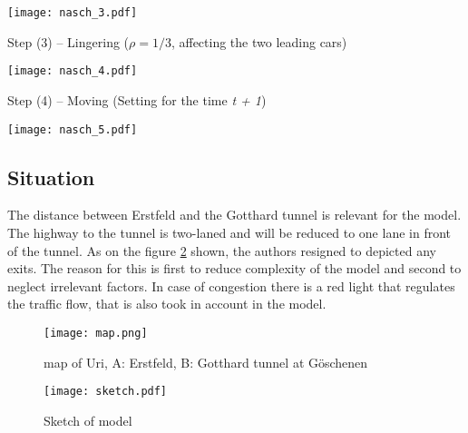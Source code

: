 \texttt{[image: nasch\_3.pdf]}\vspace*{1cm}

Step (3) -- Lingering ($\rho = 1/3$, affecting the two leading cars)\\ \vspace{-.2cm}

\texttt{[image: nasch\_4.pdf]}\vspace*{1cm}

Step (4) -- Moving (Setting for the time \textit{t + 1})\\ \vspace{-.2cm}

\texttt{[image: nasch\_5.pdf]}


\subsection{Situation}
The distance between Erstfeld and the Gotthard tunnel is relevant for the model. The highway to the tunnel is two-laned and will be reduced to one lane in front of the tunnel. As on the figure \ref{sketch} shown, the authors resigned to depicted any exits. The reason for this is first to reduce complexity of the model and second to neglect irrelevant factors. In case of congestion there is a red light that regulates the traffic flow, that is also took in account in the model. 

\begin{figure}[h]\centering
\texttt{[image: map.png]}
\caption{map of Uri, A: Erstfeld, B: Gotthard tunnel at Göschenen}
\label{map}
\end{figure}

\begin{figure}[h]\centering
\texttt{[image: sketch.pdf]}
\caption{Sketch of model}
\label{sketch}
\end{figure}